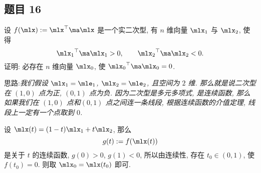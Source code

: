 \subsection*{ 题目 16 }
\begin{problem*}
设 $f(\mlx) := \mlx^\top \ma \mlx$ 是一个实二次型, 有 $n$ 维向量 $\mlx_1$ 与 $\mlx_2$, 使得
\[
\quadform{\mlx_1}{\ma} > 0, \qquad \quadform{\mlx_2}{\ma} < 0.
\]
证明: 必存在 $n$ 维向量 $\mlx_0$, 使 $\quadform{\mlx_0}{\ma} = 0$.
\end{problem*}
\begin{solution}
思路:\textit{我们假设 $\mlx_1 = \mle_1$, $\mlx_2 = \mle_2$, 且空间为 $2$ 维. 那么就是说二次型在 $(1, 0)$ 点为正, $(0, 1)$ 点为负. 因为二次型是多元多项式, 是连续函数, 那么如果我们在 $(1, 0)$ 点和$(0, 1)$ 点之间连一条线段, 根据连续函数的介值定理, 线段上一定有一个点取到 $0$.}

设 $\mlx(t) = (1 - t)\mlx_1 + t\mlx_2$, 那么
\[
    g(t) := f(\mlx(t))
\]  
是关于 $t$ 的连续函数, $g(0) > 0$, $g(1) < 0$, 所以由连续性, 存在 $t_0 \in (0, 1)$, 使 $f(t_0) = 0$. 则取 $\mlx_0 = \mlx(t_0)$ 即可.
\end{solution}

\newpage

